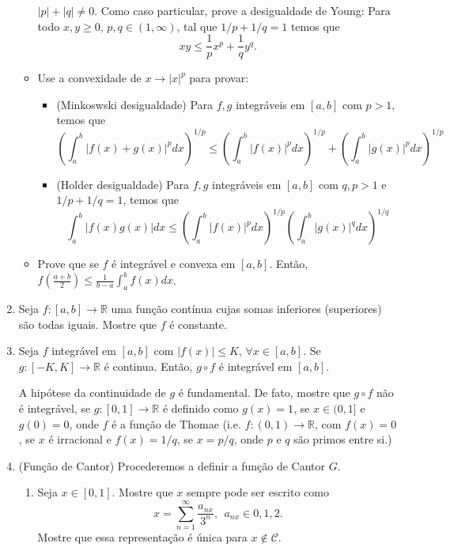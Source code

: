 \documentclass{article}
\theoremstyle{plain}
\theoremstyle{definition}
\theoremstyle{remark}
\newcommand{\R}{{\mathbb R}}
\begin{document}
\begin{enumerate}
\begin{itemize}
     $|p|+|q|\neq0$.
    Como caso particular, prove a desigualdade de Young: Para todo $x,y \geq 0$, $p,q\in(1,\infty)$, tal que $1/p+1/q=1$ temos que 
    $$ xy \leq \frac{1}{p} x^{p}+\frac{1}{q}y^{q}. $$
    \item Use a convexidade de $x\rightarrow |x|^{p}$  para provar:
      \begin{itemize}
      \item (Minkoswski desigualdade) Para $f, g$
      integráveis em $[a,b]$ com $p>1$, temos que 
      $$
      \left(\int_{a}^{b} |f(x)+g(x)|^{p}dx\right)^{1/p} \leq \left(\int_{a}^{b} |f(x)|^{p}dx\right)^{1/p}
      +\left(\int_{a}^{b} |g(x)|^{p}dx\right)^{1/p}$$
      \item (Holder desigualdade)
      Para $f, g$
      integráveis em $[a,b]$ com $q, p>1$
      e $1/p+1/q=1$, temos que 
      $$
      \int_{a}^{b} |f(x)g(x)|dx  \leq \left(\int_{a}^{b} |f(x)|^{p}dx\right)^{1/p}
\left(\int_{a}^{b} |g(x)|^{q}dx\right)^{1/q}$$
      \end{itemize}
    \item Prove que se $f$ é integrável e convexa em $[a,b]$.
    Então, $f(\frac{a+b}{2}) \leq \frac{1}{b-a}\int_{a}^b  f(x)dx$.
   \end{itemize} 
  \item Seja $f:[a,b] \rightarrow \mathbb{R}$ uma função contínua cujas somas inferiores (superiores) são todas iguais. Mostre que $f$ é constante.
  \item Seja $f$ integrável em $[a,b]$ com 
  $|f(x)|\leq K$, $\forall x \in [a,b]$. Se 
  $g:[-K,K]\rightarrow \R$ é continua. Então, 
  $g \circ f$ é integrável em $[a,b]$.
  
  A hipótese da continuidade de $g$ é fundamental. 
  De fato, mostre que $g \circ f$ não é integrável, se $g:[0,1]\rightarrow \R$ é definido como  
  $g(x)=1$, se $x \in (0,1]$ e $g(0)=0$, onde 
  $f$ é a função de Thomae (i.e. 
  $f:(0,1)\rightarrow \R$, com $f(x)=0$, se $x$ é irracional e $f(x)=1/q$, se 
  $x=p/q$, onde $p$ e $q$ são primos entre si.)
  \item (Função de Cantor) 
  Procederemos a definir a função de Cantor $G$.
  \begin{enumerate}
   \item Seja 
   $x \in [0,1]$. 
   Mostre que $x$ sempre pode ser escrito como 
   $$ x= \sum_{n=1}^{\infty} \frac{a_{nx}}{3^{n}}, \ \ a_{nx} \in {0,1,2}.$$
   Mostre que essa representação é única para $x \notin \mathcal{C}$.
   

\end{enumerate}
\end{enumerate}
\end{document}
